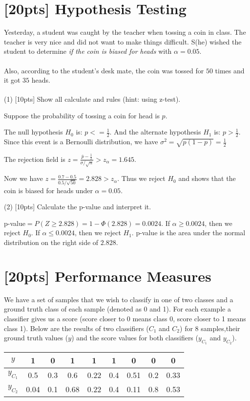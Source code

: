 	\section{[20pts] Hypothesis Testing}
	Yesterday, a student was caught by the teacher when tossing a coin in class. The teacher is very nice and did not want to make things difficult. S(he) wished the student to determine \emph{if the coin is biased for heads} with $\alpha = 0.05$.\\ \\
	Also, according to the student’s desk mate, the coin was tossed for $50$ times and it got $35$ heads. \\ \\
	(1) [10pts] Show all calculate and rules (hint: using z-test). \\
	\begin{solution}
		Suppose the probability of tossing a coin for head is $p$.

		The null hypothesis $H_0$ is: $p<=\frac{1}{2}$. And the alternate hypothesis $H_1$ is: $p>\frac{1}{2}$. Since this event is a Bernoulli distribution, we have $\sigma^2=\sqrt{p(1-p)}=\frac{1}{2}$

		The rejection field is $z=\frac{\overline{p}-\frac{1}{2}}{\sigma/\sqrt{n}}>z_{\alpha}=1.645$.
		
		Now we have $z=\frac{0.7-0.5}{0.5/\sqrt{50}}=2.828>z_{\alpha}$. Thus we reject $H_0$ and shows that the coin is biased for heads under $\alpha=0.05$.
	\end{solution}
	
	(2) [10pts] Calculate the p-value and interpret it.

	\begin{solution}
		p-value$=P(Z\geq 2.828)=1-\Phi(2.828)=0.0024$. If $\alpha\geq 0.0024$, then we reject $H_0$. If $\alpha\leq 0.0024$, then we reject $H_1$. p-value is the area under the normal distribution on the right side of $2.828$.
	\end{solution}
	
	\section{[20pts] Performance Measures}
	We have a set of samples that we wish to classify in one of two classes and a ground truth class of each sample (denoted as 0 and 1). For each example a classifier gives us a score (score closer to 0 means class 0, score closer to 1 means class 1). Below are the results of two classifiers ($C_1$ and $C_2$) for 8 samples,their ground truth values ($y$) and the score values for both classifiers ($y_{C_1}$ and $y_{C_2}$).
	\begin{table}[htbp]
		\centering
		\begin{tabular}{c|cccccccc}
			\hline
			$y$ & 1 & 0 & 1 & 1 & 1 & 0 & 0 & 0\\
			\hline
			$y_{C_1}$ & 0.5 & 0.3 & 0.6 & 0.22 & 0.4 & 0.51 & 0.2 & 0.33\\
			\hline
			$y_{C_2}$ & 0.04 & 0.1 & 0.68 & 0.22 & 0.4 & 0.11 & 0.8 & 0.53\\
			\hline
		\end{tabular}
	\end{table}
	
